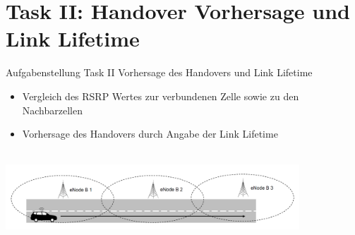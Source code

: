 \section{Task II: Handover Vorhersage und Link Lifetime}
\begin{frame}{Aufgabenstellung Task II}
Vorhersage des Handovers und Link Lifetime
	\begin{itemize}
		\item Vergleich des RSRP Wertes zur verbundenen Zelle sowie zu den Nachbarzellen
		\item Vorhersage des Handovers durch Angabe der Link Lifetime
	\end{itemize}

\quad\\

\includegraphics[width = 11cm]{taskII}
\end{frame}